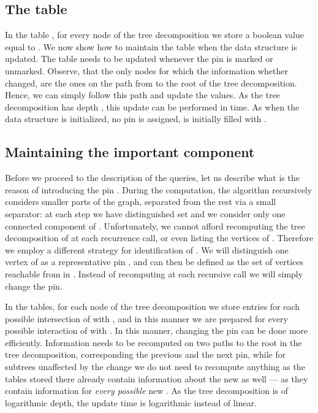 \documentclass[a4paper,11pt]{article}
\theoremstyle{definition}
\theoremstyle{remark}
\begin{document}
\subsection{The table }

In the table , for every node  of the tree decomposition we store a
boolean value  equal to .  We now show how to
maintain the table  when the data structure is updated. The table 
needs to be updated whenever the pin  is marked or unmarked.
Observe, that the only nodes  for which the information whether
 changed, are the ones on the path from  to the
root of the tree decomposition.  Hence, we can simply follow this path
and update the values.  As the tree decomposition has depth , this update can be performed in  time.  As when
the data structure is initialized, no pin is assigned,  is
initially filled with .

\subsection{Maintaining the important component }

Before we proceed to the description of the queries, let us describe
what is the reason of introducing the pin .  During the
computation, the algorithm recursively considers smaller parts of the
graph, separated from the rest via a small separator: at each step we
have distinguished set  and we consider only one connected
component  of .  Unfortunately, we cannot afford
recomputing the tree decomposition of  at each recurrence call, or
even listing the vertices of .  Therefore we employ a different
strategy for identification of .  We will distinguish one vertex of
 as a representative pin , and  can then be defined as the
set of vertices reachable from  in .  Instead of
recomputing  at each recursive call we will simply change the
pin.

In the tables, for each node  of the tree decomposition we store
entries for each possible intersection of  with , and in this
manner we are prepared for every possible interaction of  with
.  In this manner, changing the pin can be done more efficiently.
Information needs to be recomputed on two paths to the root in the
tree decomposition, corresponding the previous and the next pin, while
for subtrees unaffected by the change we do not need to recompute
anything as the tables stored there already contain information about
the new  as well --- as they contain information for {\emph{every
    possible}} new .  As the tree decomposition is of logarithmic
depth, the update time is logarithmic instead of linear.
\end{document}
